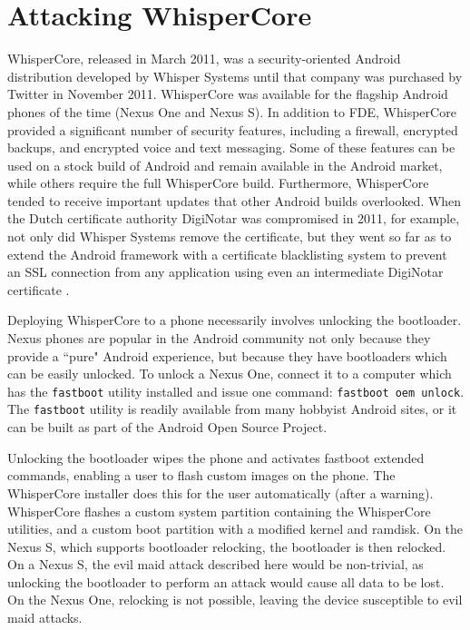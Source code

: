 \section{Attacking WhisperCore}
WhisperCore, released in March 2011, was a security-oriented Android distribution developed by Whisper Systems until that company was purchased by Twitter in November 2011.
WhisperCore was available for the flagship Android phones of the time (Nexus One and Nexus S). In addition to FDE, WhisperCore
provided a significant number of security features, including a firewall, encrypted backups, and encrypted voice and text messaging.
Some of these features can be used on a stock build of Android and remain available in the Android market, while others require the
full WhisperCore build.  Furthermore, WhisperCore tended to receive important updates that other Android builds overlooked. When the
Dutch certificate authority DigiNotar was compromised in 2011, for example, not only did Whisper Systems remove the certificate, but
they went so far as to extend the Android framework with a certificate blacklisting system to prevent an SSL connection from any
application using even an intermediate DigiNotar certificate \cite{whispernotar}. 

Deploying WhisperCore to a phone necessarily involves unlocking the bootloader. Nexus phones are popular in the
Android community not only because they provide a ``pure" Android experience, but because they have bootloaders which can be easily
unlocked.  To unlock a Nexus One, connect it to a computer which has the \texttt{fastboot} utility installed and issue one command:
\texttt{fastboot oem unlock}. The \texttt{fastboot} utility is readily available from many hobbyist Android sites, or it can be built
as part of the Android Open Source Project.

Unlocking the bootloader wipes the phone and activates fastboot extended commands, enabling a user to flash custom images on the
phone.  The WhisperCore installer does this for the user automatically (after a warning).  WhisperCore flashes a custom system
partition containing the WhisperCore utilities, and a custom boot partition with a modified kernel and ramdisk.  On the Nexus S,
which supports bootloader relocking, the bootloader is then relocked.  On a Nexus S, the evil maid attack described here would be
non-trivial, as unlocking the bootloader to perform an attack would cause all data to be lost.  On the Nexus One, relocking is not
possible, leaving the device susceptible to evil maid attacks. 

